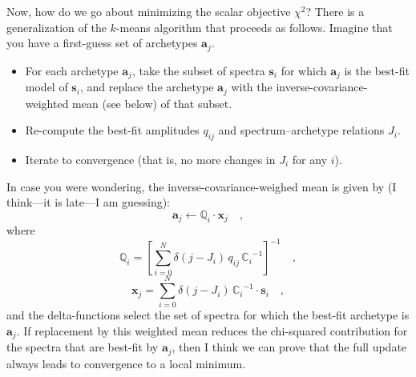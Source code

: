 \documentclass[12pt]{article}
\newcommand{\ampij}{q_{ij}}
\newcommand{\chisq}{\chi^2}
\newcommand{\Mvector}[1]{\mathbf{#1}}
\newcommand{\point}{\Mvector{s}}
\newcommand{\spectrumi}{\point_i}
\newcommand{\archetypej}{\Mvector{a}_j}
\newcommand{\xxj}{\Mvector{x}_j}
\newcommand{\Mmatrix}[1]{\mathbb{#1}}
\newcommand{\covari}{\Mmatrix{C}_i}
\newcommand{\covarj}{\Mmatrix{Q}_i}
\newcommand{\inverse}[1]{{#1}^{-1}}
\newcommand{\invcovari}{\inverse{\covari}}
\begin{document}
Now, how do we go about minimizing the scalar objective $\chisq$?
There is a generalization of the $k$-means algorithm that proceeds as
follows.  Imagine that you have a first-guess set of archetypes
$\archetypej$.
\begin{itemize}
\item For each archetype $\archetypej$, take the subset of spectra
$\spectrumi$ for which $\archetypej$ is the best-fit model of
$\spectrumi$, and replace the archetype $\archetypej$ with the
inverse-covariance-weighted mean (see below) of that subset.
\item Re-compute the best-fit amplitudes $\ampij$ and
spectrum--archetype relations $J_i$.
\item Iterate to convergence (that is, no more changes in $J_i$ for any $i$).
\end{itemize}
In case you were wondering, the inverse-covariance-weighed mean is
given by (I think---it is late---I am guessing):
\begin{equation}
\archetypej \leftarrow \covarj\cdot\xxj \quad ,
\end{equation}
where
\begin{equation}
\covarj = \inverse{\left[\sum_{i=0}^N
                         \delta(j-J_i)\,\ampij\,\invcovari\right]} \quad ,
\end{equation}
\begin{equation}
\xxj = \sum_{i=0}^N \delta(j-J_i)\,\invcovari\cdot\spectrumi \quad ,
\end{equation}
and the delta-functions select the set of spectra for which the
best-fit archetype is $\archetypej$.  If replacement by this weighted
mean reduces the chi-squared contribution for the spectra that are
best-fit by $\archetypej$, then I think we can prove that the full
update always leads to convergence to a local minimum.
\end{document}
